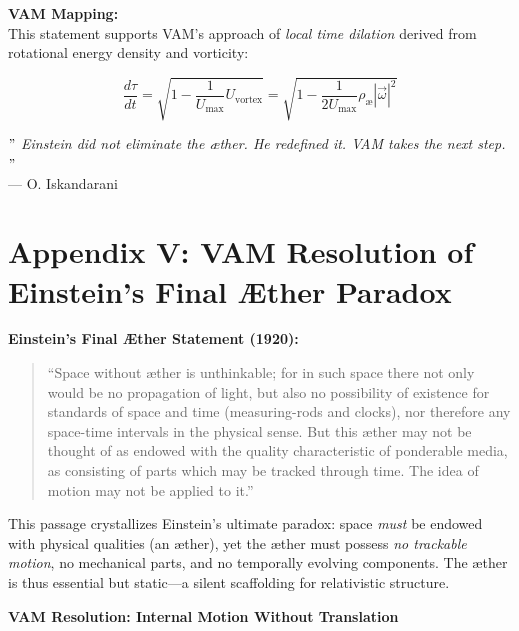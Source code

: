 \documentclass[preprint,notitlepage]{revtex4-2}
\begin{document}
    \textbf{VAM Mapping:} \\
    This statement supports VAM's approach of \emph{local time dilation} derived from rotational energy density and vorticity:

    \[
    \frac{d\tau}{dt} = \sqrt{1 - \frac{1}{U_\text{max}} U_{\text{vortex}}} = \sqrt{1 - \frac{1}{2U_\text{max}} \rho_\text{\ae} |\vec{\omega}|^2}
    \]

    \bigskip
    \textit{ \("\) Einstein did not eliminate the æther. He redefined it. VAM takes the next step. \("\)}\\
    \hfill — O. Iskandarani\\

\section*{Appendix V: VAM Resolution of Einstein’s Final Æther Paradox}
\label{appendix:final-aether}

    \vspace{-0.5em}

    \noindent
    \textbf{Einstein’s Final Æther Statement (1920):}
    \begin{quote}
        “Space without æther is unthinkable; for in such space there not only would be no propagation of light, but also no possibility of existence for standards of space and time (measuring-rods and clocks), nor therefore any space-time intervals in the physical sense. But this æther may not be thought of as endowed with the quality characteristic of ponderable media, as consisting of parts which may be tracked through time. The idea of motion may not be applied to it.”
    \end{quote}

    \noindent
    This passage crystallizes Einstein’s ultimate paradox: space \emph{must} be endowed with physical qualities (an æther), yet the æther must possess \emph{no trackable motion}, no mechanical parts, and no temporally evolving components. The æther is thus essential but static—a silent scaffolding for relativistic structure.

    \vspace{0.5em}
    \noindent
    \textbf{VAM Resolution: Internal Motion Without Translation}
\end{document}
